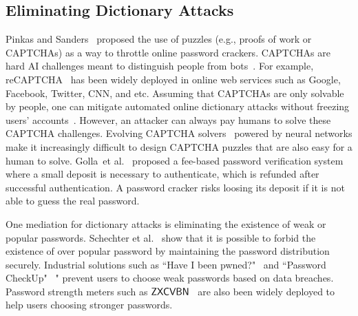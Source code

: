 \subsection{Eliminating Dictionary Attacks} 

 Pinkas and Sanders~\cite{CCS:PinSan02} proposed the use of puzzles (e.g., proofs of work or CAPTCHAs) as a way to throttle online password crackers. CAPTCHAs are hard AI challenges meant to distinguish people from bots~\cite{EC:vBHL03}. For example, reCAPTCHA~\cite{von2008recaptcha} has been widely deployed in online web services such as Google, Facebook, Twitter, CNN, and etc. Assuming that CAPTCHAs are only solvable by people, one can mitigate automated online dictionary attacks without freezing users' accounts~\cite{SP:BBFNJ10,CCS:BurMarMit11}. However, an attacker can always pay humans to solve these CAPTCHA challenges\cite{captchaSolver}. Evolving CAPTCHA solvers~\cite{NDSS:GYCZLT16,CCS:YTFZFX18} powered by neural networks make it increasingly difficult to design CAPTCHA puzzles that are also easy for a human to solve.  Golla~et al.~\cite{SOUPS:GBD17} proposed a fee-based password verification system where a small deposit is necessary to authenticate, which is refunded after successful authentication. A password cracker risks loosing its deposit if it is not able to guess the real password.  


 One mediation for dictionary attacks is eliminating the existence of weak or popular passwords. Schechter et al.~\cite{HTS:SchHerMit10} show that it is possible to forbid the existence of over popular password by maintaining the password distribution securely. Industrial solutions such as ``Have I been pwned?"~\cite{WebSite:HaveIBeenPwned} and ``Password CheckUp"~\cite{WebSite:GooglePasswordCheckUp} " prevent users to choose weak passwords based on data breaches. Password strength meters such as $\mathsf{ZXCVBN}$~\cite{USENIX:Wheeler16} are also been widely deployed to help users choosing stronger passwords.


